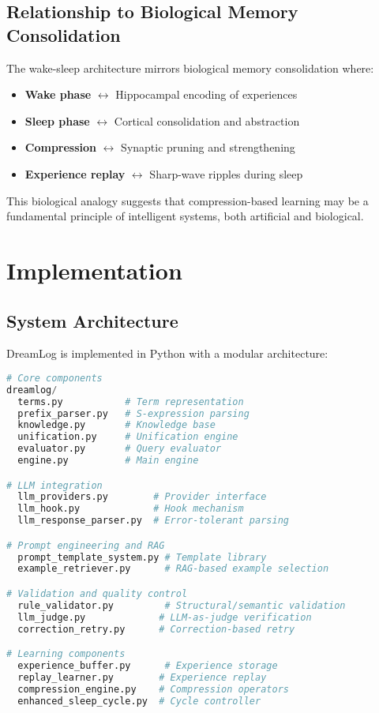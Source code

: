 \documentclass[10pt,conference]{IEEEtran}
\begin{document}
\subsection{Relationship to Biological Memory Consolidation}

The wake-sleep architecture mirrors biological memory consolidation where:
\begin{itemize}
\item \textbf{Wake phase} $\leftrightarrow$ Hippocampal encoding of experiences
\item \textbf{Sleep phase} $\leftrightarrow$ Cortical consolidation and abstraction
\item \textbf{Compression} $\leftrightarrow$ Synaptic pruning and strengthening
\item \textbf{Experience replay} $\leftrightarrow$ Sharp-wave ripples during sleep
\end{itemize}

This biological analogy suggests that compression-based learning may be a fundamental principle of intelligent systems, both artificial and biological.

\section{Implementation}

\subsection{System Architecture}

DreamLog is implemented in Python with a modular architecture:

\begin{lstlisting}[language=Python]
# Core components
dreamlog/
  terms.py           # Term representation
  prefix_parser.py   # S-expression parsing
  knowledge.py       # Knowledge base
  unification.py     # Unification engine
  evaluator.py       # Query evaluator
  engine.py          # Main engine

# LLM integration
  llm_providers.py        # Provider interface
  llm_hook.py             # Hook mechanism
  llm_response_parser.py  # Error-tolerant parsing

# Prompt engineering and RAG
  prompt_template_system.py # Template library
  example_retriever.py      # RAG-based example selection

# Validation and quality control
  rule_validator.py         # Structural/semantic validation
  llm_judge.py             # LLM-as-judge verification
  correction_retry.py      # Correction-based retry

# Learning components
  experience_buffer.py      # Experience storage
  replay_learner.py        # Experience replay
  compression_engine.py    # Compression operators
  enhanced_sleep_cycle.py  # Cycle controller
\end{lstlisting}
\end{document}
